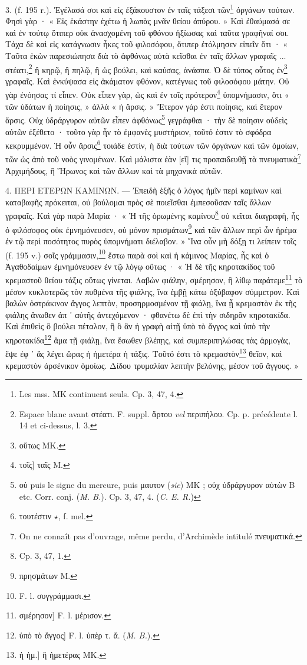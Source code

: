 \documentclass[a4paper, 11pt, oneside, polutonikogreek, french]{article}
\begin{document}
3. (f. 195 r.). Ἐγέλασά σοι καὶ εἰς ἐξάκουστον ἐν ταῖς τάξεσι τῶν\footnote{Les mss. MK continuent seuls. Cp. 3, 47, 4.} ὀργάνων τούτων. Φησὶ γὰρ · « Εἰς ἑκάστην ἐχέτω ἡ λωπὰς μνᾶν θείου ἀπύρου. » Καὶ ἐθαύμασά σε καὶ ἐν τούτῳ ὅτιπερ οὐκ ἀνασχομένη τοῦ φθόνου ἠξίωσας καὶ ταῦτα γραφῆναί σοι. Τάχα δὲ καὶ εἰς κατάγνωσιν ἧκες τοῦ φιλοσόφου, ὅτιπερ ἐτόλμησεν εἰπεῖν ὅτι · « Ταῦτα ἑκὼν παρεσιώπησα διὰ τὸ ἀφθόνως αὐτὰ κεῖσθαι ἐν ταῖς ἄλλων γραφαῖς ... στέατι,\footnote{Espace blanc avant στέατι. F. suppl. ἄρτου \emph{vel} περιπήλου. Cp. p. précédente l. 14 et ci-dessus, l. 3.} ἢ κηρῷ, ἢ πηλῷ, ἢ ὡς βούλει, καὶ καύσας, ἀνάσπα. Ὁ δὲ τύπος οὗτος ἐν\footnote{οὕτως MK.} γραφαῖς. Καὶ ἐνκύψασα εἰς ἀκάματον φθόνον, κατέγνως τοῦ φιλοσόφου μάτην. Οὐ γὰρ ἐνόησας τί εἶπεν. Οὐκ εἶπεν γὰρ, ὡς καὶ ἐν τοῖς πρότερον\footnote{τοῖς] ταῖς M.} ὐπομνήμασιν, ὅτι « τῶν ὑδάτων ἡ ποίησις, » ἀλλὰ « ἠ ἄρσις. » Ἕτερον γάρ ἐστι ποίησις, καὶ ἕτερον ἄρσις. Οὐχ ὑδράργυρον αὐτῶν εἶπεν ἀφθόνως\footnote{οὐ puis le signe du mercure, puis μαυτον (\emph{sic}) MK ; οὐχ ὑδράργυρον αὐτὼν B etc. Corr. conj. (\emph{M. B.}). Cp. 3, 47, 4. (\emph{C. E. R.})} γεγράφθαι · τὴν δὲ ποίησιν οὐδεὶς αὐτῶν ἐξέθετο · τοῦτο γὰρ ἦν τὸ ἐμφανὲς μυστήριον, τοῦτό ἐστιν τὸ σφόδρα κεκρυμμένον. Ἡ οὖν ἄρσις\footnote{τουτέστιν $\star$, f. mel.} τοιάδε ἐστὶν, ἡ διὰ τούτων τῶν ὀργάνων καὶ τῶν ὁμοίων, τῶν ὡς ἀπὸ τοῦ νοὸς γινομένων. Καὶ μάλιστα ἐὰν [εἴ] τις προπαιδευθῇ τὰ πνευματικὰ\footnote{On ne connaît pas d'ouvrage, même perdu, d'Archimède intitulé πνευματικά.} Ἀρχιμήδους, ἢ Ἥρωνος καὶ τῶν ἄλλων καὶ τὰ μηχανικὰ αὐτῶν.

4. ΠΕΡΙ ΕΤΕΡΩΝ ΚΑΜΙΝΩΝ. --- Ἐπειδὴ ἑξῆς ὁ λόγος ἡμῖν περὶ καμίνων καὶ καταβαφῆς πρόκειται, οὐ βούλομαι πρὸς σὲ ποιεῖσθαι ἐμπεσοῦσαν ταῖς ἄλλων γραφαῖς. Καὶ γὰρ παρὰ Μαρία · « Ἡ τῆς ὁρωμένης καμίνου\footnote{Cp. 3, 47, 1.} οὐ κεῖται διαγραφὴ, ἧς ὁ φιλόσοφος οὐκ ἐμνημόνευσεν, οὐ μόνον πρισμάτων\footnote{πρησμάτων M.} καὶ τῶν ἄλλων περὶ ὧν ἠρέμα ἐν τῷ περὶ ποσότητος πυρὸς ὑπομνήματι διέλαβον. » Ἵνα οὖν μὴ δόξῃ τι λείπειν τοῖς (f. 195 v.) σοῖς γράμμασιν,\footnote{F. l. συγγράμμασι.} ἔστω παρὰ σοὶ καὶ ἡ κάμινος Μαρίας, ἧς καὶ ὁ Ἀγαθοδαίμων ἐμνημόνευσεν ἐν τῷ λόγῳ οὕτως · « Ἡ δὲ τῆς κηροτακίδος τοῦ κρεμαστοῦ θείου τάξις οὕτως γίνεται. Λαβὼν φιάλην, σμέρησον, ἢ λίθῳ παράτεμε\footnote{σμέρησον] F. l. μέρισον.} τὸ μέσον κυκλοτερῶς τὸν πυθμένα τῆς φιάλης, ἵνα ἐμβῇ κάτω ὀξύβαφον σύμμετρον. Καὶ βαλὼν ὀστράκινον ἄγγος λεπτὸν, προσηρμοσμένον τῇ φιάλῃ, ἵνα ᾖ κρεμαστὸν ἐκ τῆς φιάλης ἄνωθεν ἀπ ᾽ αὐτῆς ἀντεχόμενον · φθανέτω δὲ ἐπὶ τὴν σιδηρᾶν κηροτακίδα. Καὶ ἐπιθεὶς ὃ βούλει πέταλον, ἢ ὃ ἂν ἡ γραφὴ αἰτῇ ὑπὸ τὸ ἄγγος καὶ ὑπὸ τὴν κηροτακίδα\footnote{ὑπὸ τὸ ἄγγος] F. l. ὑπὲρ τ. ἄ. (\emph{M. B.}).} ἅμα τῇ φιάλῃ, ἵνα ἔσωθεν βλέπῃς, καὶ συμπεριπηλώσας τὰς ἁρμογὰς, ἕψε ἐφ ᾽ ἃς λέγει ὥρας ἡ ἡμετέρα ἡ τάξις. Τοῦτό ἐστι τὸ κρεμαστὸν\footnote{ἡ ἡμ.] ἢ ἡμετέρας MK.} θεῖον, καὶ κρεμαστὸν ἀρσένικον ὁμοίως. Δίδου τρυμαλίαν λεπτὴν βελόνης, μέσον τοῦ ἄγγους. »
\end{document}
